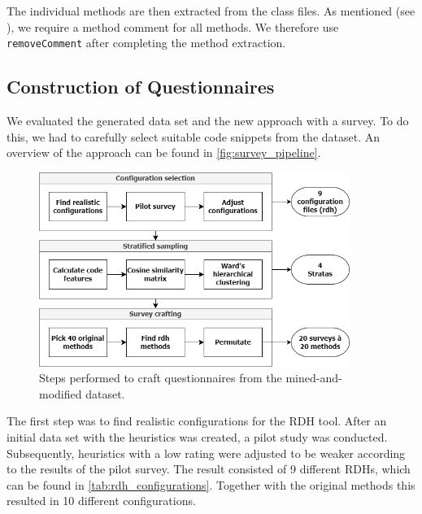 \documentclass[%
class=scrreprt,
chapterprefix=false,%
open=right,%
twoside=false,%
paper=a4,%
logofile={Logo\_zentral\_farbig\_EN.png},%
thesistype=master,%
UKenglish,%
]{se2thesis}
\theoremstyle{definition}
\begin{document}
	The individual methods are then extracted from the class files. As mentioned (see ), we require a method comment for all methods. We therefore use \texttt{removeComment} after completing the method extraction.
	
\subsection{Construction of Questionnaires} \label{Construction of Questionnaires}
	We evaluated the generated data set and the new approach with a survey. To do this, we had to carefully select suitable code snippets from the dataset. An overview of the approach can be found in \autoref{fig:survey_pipeline}.
	
	\begin{figure}[tb]
		\centering
		\includegraphics[width=0.9\textwidth]{img/survey_pipeline.png}
		\caption{Steps performed to craft questionnaires from the mined-and-modified dataset.}
		\label{fig:survey_pipeline}
	\end{figure}
		
	The first step was to find realistic configurations for the RDH tool. After an initial data set with the heuristics was created, a pilot study was conducted. Subsequently, heuristics with a low rating were adjusted to be weaker according to the results of the pilot survey. The result consisted of 9 different RDHs, which can be found in \autoref{tab:rdh_configurations}. Together with the original methods this resulted in 10 different configurations.
	
\end{document}
